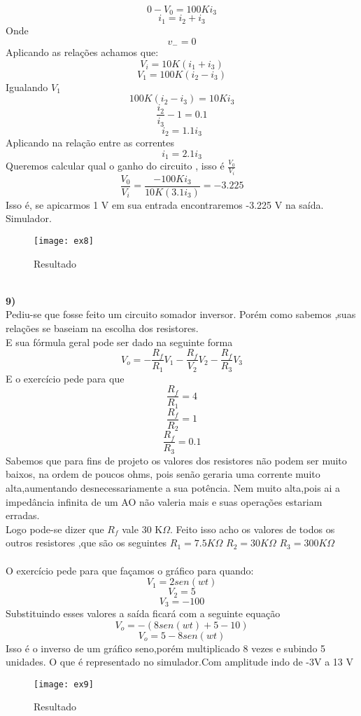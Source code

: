 \documentclass[11pt,a4paper]{article}
\begin{document}
$$0-V_0=100Ki_3$$
$$i_1=i_2+i_3$$
Onde $$v_-=0$$
Aplicando as relações achamos que:
$$V_i=10K(i_1+i_3)$$
$$V_1=100K(i_2-i_3)$$
Igualando $V_1$
$$100K(i_2-i_3)=10Ki_3$$
$$\frac{i_2}{i_3}-1=0.1$$
$$i_2=1.1i_3$$
Aplicando na relação entre as correntes
$$i_1=2.1i_3$$
Queremos calcular qual o ganho do circuito , isso é $\frac{V_0}{V_i}$
$$\frac{V_0}{V_i}=\frac{-100Ki_3}{10K(3.1i_3)}=-3.225 $$
Isso é, se apicarmos 1 V em sua entrada encontraremos -3.225 V na saída.\\
Simulador.\\
\begin{figure}[!h]
\begin{center}
\texttt{[image: ex8]}
\caption{Resultado}
\end{center}
\end{figure}
\\
\textbf{9) }
\\
Pediu-se que fosse feito um circuito somador inversor. Porém como sabemos ,suas relações se baseiam na escolha dos resistores.\\
E sua fórmula geral pode ser dado na seguinte forma
$$V_o=-\frac{R_f}{R_1}V_1 -\frac{R_f}{V_2}V_2 -\frac{R_f}{R_3}V_3$$
E o exercício pede para que 
$$\frac{R_f}{R_1}=4$$
$$\frac{R_f}{R_2}=1$$
$$\frac{R_f}{R_3}=0.1$$
Sabemos que para fins de projeto os valores dos resistores não podem ser muito baixos, na ordem de poucos ohms, pois senão geraria uma corrente muito alta,aumentando desnecessariamente a sua potência. Nem muito alta,pois ai a impedância infinita de um AO não valeria mais e suas operações estariam erradas.\\
Logo pode-se dizer que $R_f$ vale 30 K$\Omega$.
Feito isso acho os valores de todos os outros resistores ,que são os seguintes
$R_1=7.5 K\Omega$
$R_2= 30 K\Omega$
$R_3= 300 K\Omega$
\\\\
O exercício pede para que façamos o gráfico para quando:
$$V_1=2sen(wt)$$
$$V_2=5$$
$$V_3=-100$$
Substituindo esses valores a saída ficará com a seguinte equação\\
$$V_o=-(8sen(wt)+5-10)$$
$$V_o=5-8sen(wt)$$
Isso é o inverso de um gráfico seno,porém multiplicado 8 vezes e subindo 5 unidades. O que é representado no simulador.Com amplitude indo de -3V a 13 V
\begin{figure}[!h]
\begin{center}
\texttt{[image: ex9]}
\caption{Resultado}
\end{center}
\end{figure}
\end{document}
